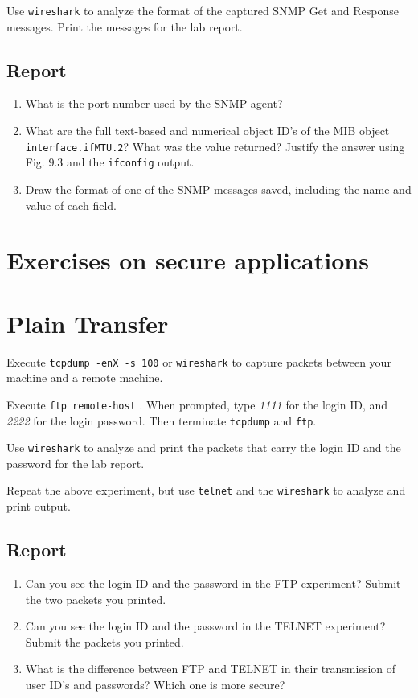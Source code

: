 \documentclass{../UTNetLab}
\begin{document}
    Use \lstinline{wireshark} to analyze the format of the captured SNMP Get and Response messages. Print the messages for the lab report.
    
    \subsection*{Report}
    \begin{enumerate}
        \item What is the port number used by the SNMP agent?
        \item What are the full text-based and numerical object ID’s of the MIB object \texttt{interface.ifMTU.2}? What was the value returned? Justify the answer using Fig. 9.3 and the \lstinline{ifconfig} output.
        \item Draw the format of one of the SNMP messages saved, including the name and value of each field.
    \end{enumerate}

\section*{Exercises on secure applications}
    
\section{Plain Transfer}
    Execute \lstinline{tcpdump -enX -s 100} or \lstinline{wireshark} to capture packets between your machine and a remote machine.

    Execute \lstinline[emph={remote-host}]{ftp remote-host} . When prompted, type \textit{1111} for the login ID, and \textit{2222} for the login password. Then terminate \lstinline{tcpdump} and \lstinline{ftp}.

    Use \lstinline{wireshark} to analyze and print the packets that carry the login ID and the password for the lab report.

    Repeat the above experiment, but use \lstinline{telnet} and the \lstinline{wireshark} to analyze and print output.

    \subsection*{Report}
    \begin{enumerate}
        \item Can you see the login ID and the password in the FTP experiment? Submit the two packets you printed.
        \item Can you see the login ID and the password in the TELNET experiment? Submit the packets you printed.
        \item What is the difference between FTP and TELNET in their transmission of user ID’s and passwords? Which one is more secure?
    \end{enumerate}
\end{document}
